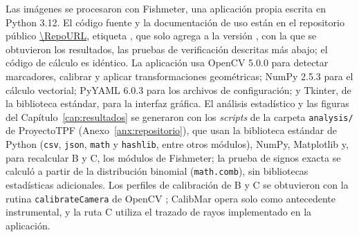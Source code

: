 Las imágenes se procesaron con Fishmeter, una aplicación propia escrita en Python 3.12. El código fuente y la documentación de uso están en el repositorio público \url{\RepoURL}, etiqueta \texttt{\RepoTag}, que solo agrega a la versión \texttt{\RepoTagBase}, con la que se obtuvieron los resultados, las pruebas de verificación descritas más abajo; el código de cálculo es idéntico. La aplicación usa OpenCV 5.0.0 para detectar marcadores, calibrar y aplicar transformaciones geométricas; NumPy 2.5.3 para el cálculo vectorial; PyYAML 6.0.3 para los archivos de configuración; y Tkinter, de la biblioteca estándar, para la interfaz gráfica. El análisis estadístico y las figuras del Capítulo~\ref{cap:resultados} se generaron con los \emph{scripts} de la carpeta \texttt{analysis/} de ProyectoTPF (Anexo~\ref{anx:repositorio}), que usan la biblioteca estándar de Python (\texttt{csv}, \texttt{json}, \texttt{math} y \texttt{hashlib}, entre otros módulos), NumPy, Matplotlib y, para recalcular B y C, los módulos de Fishmeter; la prueba de signos exacta se calculó a partir de la distribución binomial (\texttt{math.comb}), sin bibliotecas estadísticas adicionales. Los perfiles de calibración de B y C se obtuvieron con la rutina \texttt{calibrateCamera} de OpenCV \parencite{Zhang2000}; CalibMar \parencite{Seegraber2025} opera solo como antecedente instrumental, y la ruta C utiliza el trazado de rayos implementado en la aplicación.
\\
